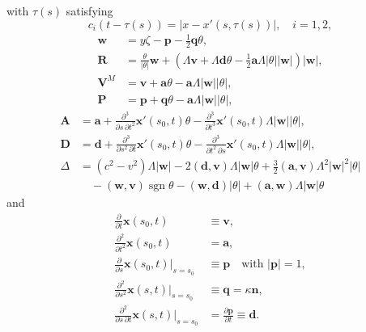 \documentclass[12pt]{article}
\begin{document}
with $\tau(s)$ satisfying
\begin{equation}
c_i(t-\tau(s)) = |x - x'(s,\tau(s))|, \quad i=1,2,
\end{equation}
\begin{align*}
\mathbf{w} &= y\zeta - \mathbf{p} - \tfrac{1}{2}\mathbf{q}\theta, \\
\mathbf{R} &= \frac{\theta}{|\theta|}\mathbf{w} + (\Lambda\mathbf{v} + \Lambda\mathbf{d}\theta - \tfrac{1}{2}\mathbf{a}\Lambda|\theta||\mathbf{w}|)|\mathbf{w}|, \\
\mathbf{V}^M &= \mathbf{v} + \mathbf{a}\theta - \mathbf{a}\Lambda|\mathbf{w}||\theta|, \\
\mathbf{P} &= \mathbf{p} + \mathbf{q}\theta - \mathbf{a}\Lambda|\mathbf{w}||\theta|,
\end{align*}
\begin{align}
\mathbf{A} &= \mathbf{a} + \frac{\partial^3}{\partial s\,\partial t^2}\mathbf{x}'(s_0,t)\theta - \frac{\partial^3}{\partial t^3}\mathbf{x}'(s_0,t)\Lambda|\mathbf{w}||\theta|, \nonumber \\
\mathbf{D} &= \mathbf{d} + \frac{\partial^3}{\partial s^2\,\partial t}\mathbf{x}'(s_0,t)\theta - \frac{\partial^3}{\partial t^2\,\partial s}\mathbf{x}'(s_0,t)\Lambda|\mathbf{w}||\theta|, \nonumber \\
\Delta &= (c^2-v^2)\Lambda|\mathbf{w}| - 2(\mathbf{d},\mathbf{v})\Lambda|\mathbf{w}|\theta + \tfrac{3}{2}(\mathbf{a},\mathbf{v})\Lambda^2|\mathbf{w}|^2|\theta| \nonumber \\
&\quad - (\mathbf{w},\mathbf{v})\operatorname{sgn}\theta - (\mathbf{w},\mathbf{d})|\theta| + (\mathbf{a},\mathbf{w})\Lambda|\mathbf{w}|\theta
\end{align}
and
\begin{equation}
\begin{aligned}
\frac{\partial}{\partial t}\mathbf{x}(s_0,t) &\equiv \mathbf{v}, \\
\frac{\partial^2}{\partial t^2}\mathbf{x}(s_0,t) &= \mathbf{a}, \\
\frac{\partial}{\partial s}\mathbf{x}(s_0,t)\big|_{s=s_0} &\equiv \mathbf{p} \quad \text{with } |\mathbf{p}|=1, \\
\frac{\partial^2}{\partial s^2}\mathbf{x}(s,t)\big|_{s=s_0} &\equiv \mathbf{q} = \kappa\mathbf{n}, \\
\frac{\partial^2}{\partial s\,\partial t}\mathbf{x}(s,t)\big|_{s=s_0} &= \frac{\partial\mathbf{p}}{\partial t} \equiv \mathbf{d}.
\end{aligned}
\end{equation}
\end{document}
